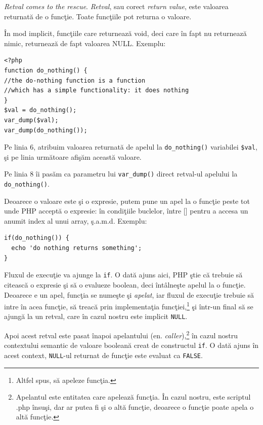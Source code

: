 \textit{Retval comes to the rescue}. \textsl{Retval}, sau corect \textsl{return value},
este valoarea returnată de o funcţie. Toate funcţiile pot returna o valoare.

În mod implicit, funcţiile care returnează void, deci care în fapt nu returnează
nimic, returnează de fapt valoarea NULL. Exemplu:
\begin{lstlisting}
<?php
function do_nothing() {
//the do-nothing function is a function
//which has a simple functionality: it does nothing
}
$val = do_nothing();
var_dump($val);
var_dump(do_nothing());
\end{lstlisting}

Pe linia 6, atribuim valoarea returnată de apelul la \texttt{do\_nothing()}
variabilei \texttt{\$val}, şi pe linia următoare afişăm această valoare.

Pe linia 8 îi pasăm ca parametru lui \texttt{var\_dump()} direct retval-ul apelului
la \texttt{do\_nothing()}.


Deoarece o valoare este şi o expresie, putem pune un apel la o funcţie peste tot
unde PHP acceptă o expresie: în condiţiile buclelor, între [] pentru a accesa un
anumit index al unui array, ş.a.m.d. Exemplu:

\begin{lstlisting}
if(do_nothing()) {
  echo 'do nothing returns something';
}
\end{lstlisting}
Fluxul de execuţie va ajunge la \texttt{if}. O dată ajuns aici, PHP ştie că
trebuie să citească o expresie şi să o evalueze boolean, deci întâlneşte apelul
la o funcţie. Deoarece e un apel, funcţia se numeşte şi \textsl{apelat},
iar fluxul de execuţie trebuie să intre în
acea funcţie, să treacă prin implementaţia funcţiei,\footnote{Altfel spus, să
apeleze funcţia.} şi într-un final
să se ajungă la un retval, care în cazul nostru este implicit \texttt{NULL}.

Apoi acest retval este pasat înapoi
apelantului (en. \textsl{caller}),\footnote{Apelantul este entitatea care apelează funcţia. În cazul nostru,
este scriptul .php însuşi, dar ar putea fi şi o altă funcţie, deoarece
o funcţie poate apela o altă funcţie.}
în cazul nostru contextului
semantic de valoare booleană creat de constructul \texttt{if}. O dată ajuns
în acest context, \texttt{NULL}-ul returnat de funcţie este evaluat ca \texttt{FALSE}.

